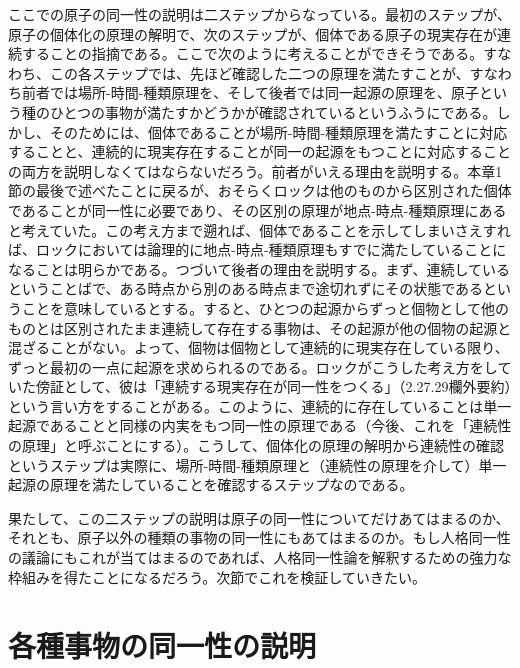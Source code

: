 \documentclass[a4j,oneside]{jsbook}
\begin{document}
ここでの原子の同一性の説明は二ステップからなっている。最初のステップが、原子の個体化の原理の解明で、次のステップが、個体である原子の現実存在が連続することの指摘である。ここで次のように考えることができそうである。すなわち、この各ステップでは、先ほど確認した二つの原理を満たすことが、すなわち前者では場所-時間-種類原理を、そして後者では同一起源の原理を、原子という種のひとつの事物が満たすかどうかが確認されているというふうにである。しかし、そのためには、個体であることが場所-時間-種類原理を満たすことに対応することと、連続的に現実存在することが同一の起源をもつことに対応することの両方を説明しなくてはならないだろう。前者がいえる理由を説明する。本章1節の最後で述べたことに戻るが、おそらくロックは他のものから区別された個体であることが同一性に必要であり、その区別の原理が地点-時点-種類原理にあると考えていた。この考え方まで遡れば、個体であることを示してしまいさえすれば、ロックにおいては論理的に地点-時点-種類原理もすでに満たしていることになることは明らかである。つづいて後者の理由を説明する。まず、連続しているということばで、ある時点から別のある時点まで途切れずにその状態であるということを意味しているとする。すると、ひとつの起源からずっと個物として他のものとは区別されたまま連続して存在する事物は、その起源が他の個物の起源と混ざることがない。よって、個物は個物として連続的に現実存在している限り、ずっと最初の一点に起源を求められるのである。ロックがこうした考え方をしていた傍証として、彼は「連続する現実存在が同一性をつくる」（2.27.29欄外要約）という言い方をすることがある。このように、連続的に存在していることは単一起源であることと同様の内実をもつ同一性の原理である（今後、これを「連続性の原理」と呼ぶことにする）。こうして、個体化の原理の解明から連続性の確認というステップは実際に、場所-時間-種類原理と（連続性の原理を介して）単一起源の原理を満たしていることを確認するステップなのである。
\par
果たして、この二ステップの説明は原子の同一性についてだけあてはまるのか、それとも、原子以外の種類の事物の同一性にもあてはまるのか。もし人格同一性の議論にもこれが当てはまるのであれば、人格同一性論を解釈するための強力な枠組みを得たことになるだろう。次節でこれを検証していきたい。
\section{
各種事物の同一性の説明
}
\end{document}
